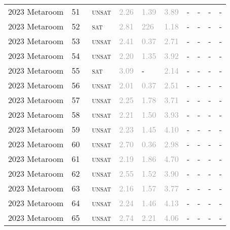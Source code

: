 \begin{center}
{\begin{longtable}{@{}llllllllll@{}}
2023 Metaroom & 51 & ~\textsc{unsat} & \textcolor{darkgray}{2.26} & \textcolor{darkgray}{1.39} & \textcolor{darkgray}{3.89} & - & - & - & - \\
2023 Metaroom & 52 & ~\textsc{sat} & \textcolor{darkgray}{2.81} & \textcolor{darkgray}{226} & \textcolor{darkgray}{1.18} & - & - & - & - \\
2023 Metaroom & 53 & ~\textsc{unsat} & \textcolor{darkgray}{2.41} & \textcolor{darkgray}{0.37} & \textcolor{darkgray}{2.71} & - & - & - & - \\
2023 Metaroom & 54 & ~\textsc{unsat} & \textcolor{darkgray}{2.20} & \textcolor{darkgray}{1.35} & \textcolor{darkgray}{3.92} & - & - & - & - \\
2023 Metaroom & 55 & ~\textsc{sat} & \textcolor{darkgray}{3.09} & - & \textcolor{darkgray}{2.14} & - & - & - & - \\
2023 Metaroom & 56 & ~\textsc{unsat} & \textcolor{darkgray}{2.01} & \textcolor{darkgray}{0.37} & \textcolor{darkgray}{2.51} & - & - & - & - \\
2023 Metaroom & 57 & ~\textsc{unsat} & \textcolor{darkgray}{2.25} & \textcolor{darkgray}{1.78} & \textcolor{darkgray}{3.71} & - & - & - & - \\
2023 Metaroom & 58 & ~\textsc{unsat} & \textcolor{darkgray}{2.21} & \textcolor{darkgray}{1.50} & \textcolor{darkgray}{3.93} & - & - & - & - \\
2023 Metaroom & 59 & ~\textsc{unsat} & \textcolor{darkgray}{2.23} & \textcolor{darkgray}{1.45} & \textcolor{darkgray}{4.10} & - & - & - & - \\
2023 Metaroom & 60 & ~\textsc{unsat} & \textcolor{darkgray}{2.70} & \textcolor{darkgray}{0.36} & \textcolor{darkgray}{2.98} & - & - & - & - \\
2023 Metaroom & 61 & ~\textsc{unsat} & \textcolor{darkgray}{2.19} & \textcolor{darkgray}{1.86} & \textcolor{darkgray}{4.70} & - & - & - & - \\
2023 Metaroom & 62 & ~\textsc{unsat} & \textcolor{darkgray}{2.55} & \textcolor{darkgray}{1.52} & \textcolor{darkgray}{3.90} & - & - & - & - \\
2023 Metaroom & 63 & ~\textsc{unsat} & \textcolor{darkgray}{2.16} & \textcolor{darkgray}{1.57} & \textcolor{darkgray}{3.77} & - & - & - & - \\
2023 Metaroom & 64 & ~\textsc{unsat} & \textcolor{darkgray}{2.24} & \textcolor{darkgray}{1.46} & \textcolor{darkgray}{4.13} & - & - & - & - \\
2023 Metaroom & 65 & ~\textsc{unsat} & \textcolor{darkgray}{2.74} & \textcolor{darkgray}{2.21} & \textcolor{darkgray}{4.06} & - & - & - & - \\

\end{longtable}}
\end{center}

